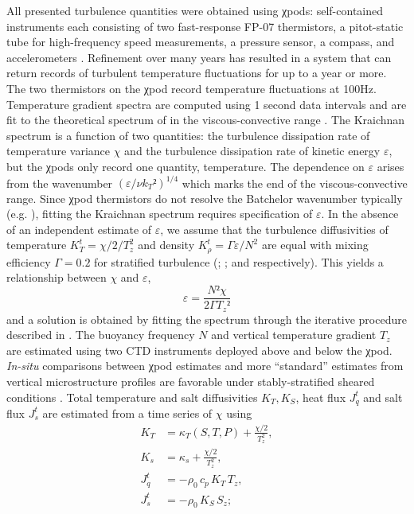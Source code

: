 \documentclass[onecol]{ametsoc}
\begin{document}
All presented turbulence quantities were obtained using χpods: self-contained instruments each consisting of two fast-response FP-07 thermistors, a pitot-static tube for high-frequency speed measurements, a pressure sensor, a compass, and accelerometers \citep{Moum2009a,Moum2015}.
Refinement over many years has resulted in a system that can return records of turbulent temperature fluctuations for up to a year or more.
The two thermistors on the χpod record temperature fluctuations at 100Hz.
Temperature gradient spectra are computed using 1 second data intervals and are fit to the theoretical spectrum of \cite{Kraichnan1968} in the viscous-convective range \citep{Moum2009a}.
The Kraichnan spectrum is a function of two quantities: the turbulence dissipation rate of temperature variance \(χ\) and the turbulence dissipation rate of kinetic energy \(ε\), but the χpods only record one quantity, temperature.
The dependence on \(ε\) arises from the \cite{Batchelor1959} wavenumber \( (ε/νk_T²)^{1/4} \) which marks the end of the viscous-convective range.
Since χpod thermistors do not resolve the Batchelor wavenumber typically (e.g. \citealp{Lueck1977}), fitting the Kraichnan spectrum requires specification of \(ε\).
In the absence of an independent estimate of \(ε\), we assume that the turbulence diffusivities of temperature  \(K^t_T = χ/2/T_z^2\) and density \(K^t_ρ = Γε/N^2\) are equal with mixing efficiency \(Γ = 0.2\) for stratified turbulence (\citealp{Osborn1972}; \citealp{Osborn1980}; and \citealp{Gregg2018} respectively).
This yields a relationship between \(χ\) and \(ε\), 
\begin{equation}
    \label{eq:eps}
    ε = \frac{N² χ}{2 Γ T_z²}
\end{equation}
and a solution is obtained by fitting the spectrum through the iterative procedure described in \cite{Moum2009a}.
The buoyancy frequency \(N\) and vertical temperature gradient \(T_z\) are estimated using two CTD instruments deployed above and below the χpod.
\emph{In-situ} comparisons between χpod estimates and more ``standard'' estimates from vertical microstructure profiles are favorable under stably-stratified sheared conditions \citep{Perlin2012,Pujiana2018}.
Total temperature and salt diffusivities \(K_T, K_S\), heat flux \(J_q^t\) and salt flux \(J_s^t\) are estimated from a time series of \(χ\) using
\begin{subequations}
\label{eq:def}
 \begin{align}
  K_T &= κ_T(S,T,P) + \frac{χ/2}{T_z^2}, \\
  K_s &= κ_s + \frac{χ/2}{T_z^2}, \\
  J_q^t &= - ρ_0\, c_p\, K_T\, T_z, \\
  J_s^t &= - ρ_0 \, K_S \, S_z;
\end{align}
\end{subequations}
\end{document}
